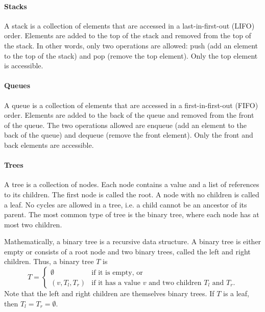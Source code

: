 
\paragraph{Stacks}  A stack is a collection of elements that are accessed in a
last-in-first-out (LIFO) order.  Elements are added to the top of the stack and
removed from the top of the stack.  In other words, only two operations are
allowed: push (add an element to the top of the stack) and pop (remove the top element).
Only the top element is accessible.

\paragraph{Queues}  A queue is a collection of elements that are accessed in a
first-in-first-out (FIFO) order.  Elements are added to the back of the queue and
removed from the front of the queue.  The two operations allowed are enqueue (add an
element to the back of the queue) and dequeue (remove the front element).  Only the
front and back elements are accessible.

\paragraph{Trees}  A tree is a collection of nodes.  Each node contains a value and a list
of references to its children.  The first node is called the root.  A node with no
children is called a leaf.  No cycles are allowed in a tree, i.e. a child cannot be an
ancestor of its parent. The most common type of tree is the binary tree, where each node
has at most two children.

Mathematically, a binary tree is a recursive data structure.  A binary tree is either
empty or consists of a root node and two binary trees, called the left and right
children.   Thus, a binary tree $T$ is
\[
  T = \begin{cases}
    \emptyset & \text{if it is empty, or} \\
    \left(v, T_l, T_r\right) & \text{if it has a value $v$ and two children $T_l$ and $T_r$.}
  \end{cases}
\]
Note that the left and right children are themselves binary trees.  If $T$ is a leaf,
then $T_l = T_r = \emptyset$.

